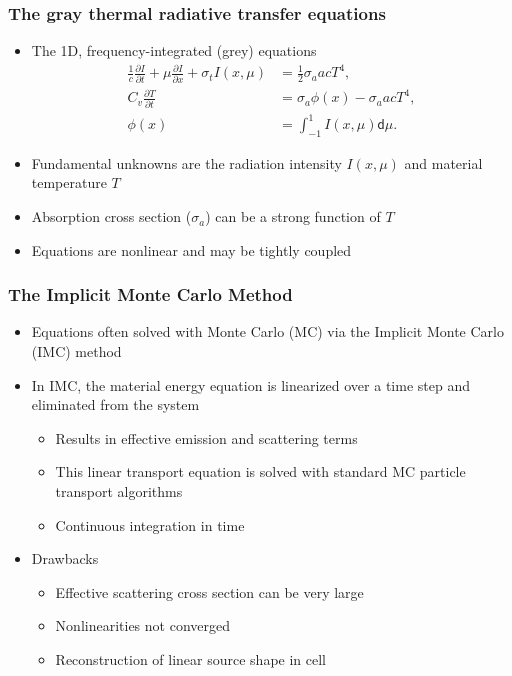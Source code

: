 \documentclass[xcolor=dvipsnames,hyperref={pdfpagelabels=false},handout,unknownkeysallowed]{beamer}
\newlength{\wideitemsep}
\let\olditem\item
\renewcommand{\item}{\setlength{\itemsep}{\wideitemsep}\olditem}
\newcommand{\pderiv}[2]{\frac{\partial #1}{\partial #2}}
\renewcommand{\d}{\mathsf{d}}
\begin{document}
\begin{frame}
\frametitle{The gray thermal radiative transfer equations}
\begin{itemize}
\item The 1D, frequency-integrated (grey) equations
\begin{align*}\label{ho_cont}
    \frac{1}{c}\pderiv{I}{t} + \mu \pderiv{I}{x} + \sigma_t I(x,\mu)
&= \frac{1}{2} \sigma_a a c T^4,
  \\
  C_v \pderiv{T}{t} &=  \sigma_a \phi(x) - \sigma_a a c T^4, \\
   \phi(x) &= \int_{-1}^1 I(x,\mu) \d \mu.
\end{align*}
        \item Fundamental unknowns are the radiation intensity $I(x,\mu)$ and material
            temperature $T$
        \item \pause Absorption cross section ($\sigma_a$) can be a strong function of $T$
        \item Equations are nonlinear and may be tightly coupled 
\end{itemize}

\end{frame}

\begin{frame}
\frametitle{The Implicit Monte Carlo Method}
\begin{itemize}
\item Equations often solved with Monte Carlo (MC) via the Implicit Monte Carlo (IMC) method
\item In IMC, the material energy equation is linearized over a time step and eliminated from the system
    \begin{itemize}
        \item Results in effective emission and scattering terms
\item This linear transport equation is solved with standard MC particle transport
    algorithms
\item Continuous integration in time
    \end{itemize}
\item Drawbacks 
\begin{itemize}
\item Effective scattering cross section can be very large 
\item Nonlinearities not converged
\item Reconstruction of linear source shape in cell
\end{itemize}
\end{itemize}
\end{frame}
\end{document}
